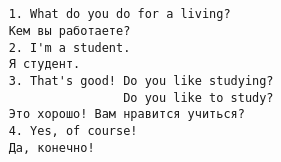 \subsection*{}
\begin{verbatim}
    1. What do you do for a living?
    Кем вы работаете?
    2. I'm a student.
    Я студент.
    3. That's good! Do you like studying?
                    Do you like to study?
    Это хорошо! Вам нравится учиться?
    4. Yes, of course!
    Да, конечно!
\end{verbatim}